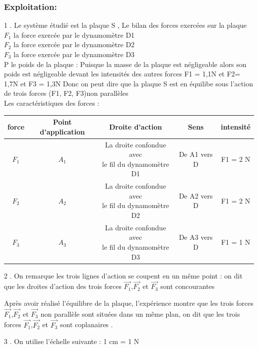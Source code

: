 \documentclass[12pt]{article}
\begin{document}
\subsubsection{ Exploitation: }
 1 . Le système étudié est la plaque {S} , Le bilan des forces exercées sur la plaque
 \\$F_1$ la force exercée par le dynamomètre D1
 \\ $F_2$ la force exercée par le dynamomètre D2
 \\ $F_3$ la force exercée par le dynamomètre D3
 \\P  le poids de la plaque : Puisque la masse de la plaque est négligeable alors son poids est négligeable devant
les intensités des autres forces F1 = 1,1N et F2= 1,7N et F3 = 1,3N
Donc on peut dire que la plaque S est en équilibe sous l’action de trois forces (F1, F2, F3)non parallèles
\\Les caractéristiques des forces : 
\begin{center}
  \begin{tabular}{|c|c|c|c|c|}
    \hline
    force & Point d’application & Droite d’action & Sens &intensité \\\hline
    $F_1$ & $A_1$               & \makecell{La droite confondue avec \\ le fil du dynamomètre D1}  & De A1 vers D  & F1 = 2 N  \\\hline
    $F_2$ & $A_2$               & \makecell{ La droite confondue avec \\ le fil du dynamomètre D2 } & De A2 vers D  & F1 = 2 N  \\\hline
    $F_3$ & $A_3$               & \makecell{La droite confondue avec\\ le fil du dynamomètre D3}& De A3 vers D  & F1 = 1 N  \\\hline

  \end{tabular}
\end{center}

2 . On remarque les trois lignes d’action se coupent en un même point : on dit que les droites d’action des
trois forces $\vec{F_1}$,$\vec{F_2}$ et $\vec{F_3}$ sont concourantes

Après avoir réalisé l’équilibre de la plaque, l’expérience montre que les trois forces $\vec{F_1}$,$\vec{F_2}$ et $\vec{F_3}$ non parallèle sont situées dans un même plan, on dit que les trois forces $\vec{F_1}$,$\vec{F_2}$ et $\vec{F_3}$ sont coplanaires .

3 . On utilise l’échelle suivante : 1 cm = 1 N
\end{document}
